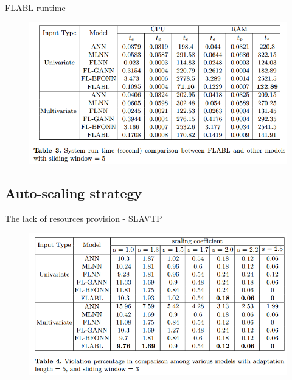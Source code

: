 \documentclass{beamer}
\begin{document}
\begin{frame}{FLABL runtime}
	\begin{figure}
		\includegraphics[width=1.0 \textwidth]{true/system_runtime.png} %
		\label{fig:forecasting_results}			
	\end{figure}
\end{frame}









\subsection{Auto-scaling strategy}
\begin{frame}{The lack of resources provision - SLAVTP}
	\begin{figure}
		\includegraphics[width=1.0 \textwidth]{true/auto_scaler1.png} %
		\label{fig:forecasting_results}			
	\end{figure}
\end{frame}
\end{document}
